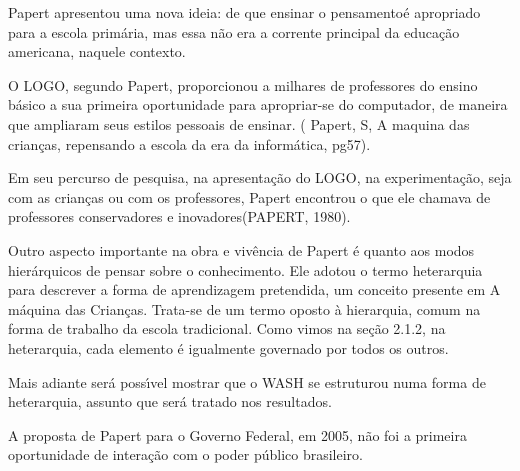 \documentclass[
12pt,		%
openright,	%
twoside,  %
a4paper,			%
chapter=TITLE,		%
english,			%
french,				%
spanish,			%
brazil				%
]{USPSC-classe/USPSC}
\begin{document}
Papert apresentou uma nova ideia: de que \textquotedbl ensinar o pensamento\textquotedbl   \'e apropriado para a escola prim\'aria, mas essa n\~ao era a corrente principal da educa\c{c}\~ao americana, naquele contexto.








O LOGO, segundo Papert, proporcionou a milhares de professores do ensino b\'asico a sua primeira oportunidade para apropriar-se do computador, de maneira que ampliaram seus estilos pessoais de ensinar. ( Papert, S, \textquotedbl A maquina das crian\c{c}as, repensando a escola da era da inform\'atica\textquotedbl , pg57).








Em seu percurso de pesquisa, na apresenta\c{c}\~ao do LOGO, na experimenta\c{c}\~ao, seja com as crian\c{c}as ou com os professores, Papert encontrou o que ele chamava de \textquotedbl professores conservadores e  inovadores\textquotedbl  (PAPERT, 1980).








Outro aspecto importante na obra e viv\^encia de Papert \'e quanto aos modos hier\'arquicos de pensar sobre o conhecimento. Ele adotou o termo  \textquotedbl  heterarquia \textquotedbl  para descrever a forma de aprendizagem pretendida, um conceito presente em  \textquotedbl A m\'aquina das Crian\c{c}as\textquotedbl . Trata-se de  um termo oposto \`a hierarquia, comum na forma de trabalho da escola tradicional. Como vimos na se\c{c}\~ao 2.1.2, na heterarquia, cada elemento \'e igualmente governado por todos os outros.








Mais adiante ser\'a poss\'{\i}vel mostrar que o WASH se estruturou numa forma de heterarquia, assunto que ser\'a tratado nos resultados.








A proposta de Papert para o Governo Federal, em 2005, n\~ao foi a primeira oportunidade de intera\c{c}\~ao com o poder p\'ublico brasileiro.
\end{document}
